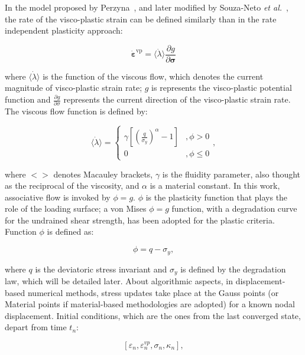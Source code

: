 \documentclass[applsci,journal,article,submit,moreauthors,pdftex]{Definitions/mdpi}
\begin{document}
In the model proposed by Perzyna~\cite{Perzyna:66}, and later modified by Souza-Neto \textit{et al.}~\cite{DPOwen2005}, the rate of the visco-plastic strain can be defined similarly than in the rate independent plasticity approach:

\begin{equation}
\dot{\boldsymbol{\varepsilon}}^{\mathrm{vp}}=\langle \dot{\lambda}\rangle \frac{\partial g}{\partial \boldsymbol{\sigma}}
\end{equation}

\noindent where  $\langle \dot{\lambda}\rangle$ is the function of the viscous flow, which denotes the current magnitude of visco-plastic strain rate; $g$ is represents the visco-plastic potential function and  $\frac{\partial g}{\partial \sigma}$ represents the current direction of the visco-plastic strain rate. The viscous flow function is defined by:

\begin{equation}
\langle \dot{\lambda}\rangle=\left\{\begin{array}{cl}\gamma\left[\left(\frac{q}{\sigma_y}\right)^\alpha-1\right] & , \phi>0 \\ 0 & , \phi \leq 0\end{array}\right. ,
\end{equation}


\noindent where $<>$ denotes Macauley brackets, $\gamma$ is the fluidity parameter, also thought as the reciprocal of the viscosity, and $\alpha$ is a material constant. In this work, associative flow is invoked by $\phi=g$. $\phi$ is the plasticity function that plays the role of the loading surface; a von Mises $\phi=g$ function, with a degradation curve for the undrained shear strength, has been adopted for the plastic criteria. Function $\phi$ is defined as:

\begin{equation}
\phi=q-\sigma_y,
\end{equation}

\noindent where $q$ is the deviatoric stress invariant and $\sigma_y$ is defined by the degradation law, which will be detailed later. About algorithmic aspects, in displacement-based numerical methods, stress updates take place at the Gauss points (or Material points if material-based methodologies are adopted) for a known nodal displacement. Initial conditions, which are the ones from the last converged state,  depart from time $t_{n}$: 

\begin{equation}
\left[\varepsilon_{n}, \varepsilon_{n}^{v p}, \sigma_{n}, \kappa_{n}\right],
\end{equation}
\end{document}
